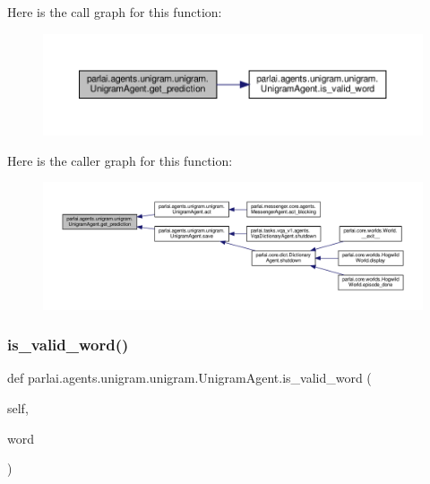 Here is the call graph for this function\+:
\nopagebreak
\begin{figure}[H]
\begin{center}
\leavevmode
\includegraphics[width=350pt]{classparlai_1_1agents_1_1unigram_1_1unigram_1_1UnigramAgent_a0688b7cf7ef26834f8ff11f0893fa45b_cgraph}
\end{center}
\end{figure}
Here is the caller graph for this function\+:
\nopagebreak
\begin{figure}[H]
\begin{center}
\leavevmode
\includegraphics[width=350pt]{classparlai_1_1agents_1_1unigram_1_1unigram_1_1UnigramAgent_a0688b7cf7ef26834f8ff11f0893fa45b_icgraph}
\end{center}
\end{figure}
\mbox{\label{classparlai_1_1agents_1_1unigram_1_1unigram_1_1UnigramAgent_ae00fc04461f0ff1442bd894a5b574a3e}} 
\subsubsection{\texorpdfstring{is\+\_\+valid\+\_\+word()}{is\_valid\_word()}}
{\footnotesize\ttfamily def parlai.\+agents.\+unigram.\+unigram.\+Unigram\+Agent.\+is\+\_\+valid\+\_\+word (\begin{DoxyParamCaption}\item[{}]{self,  }\item[{}]{word }\end{DoxyParamCaption})}


